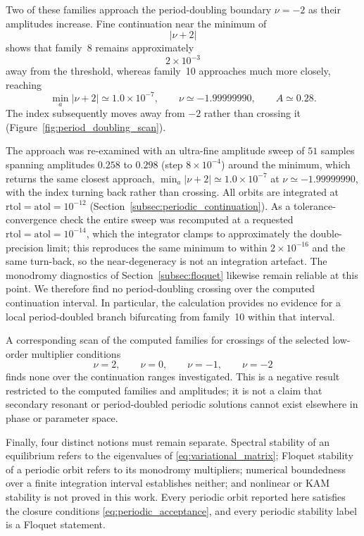 Two of these families approach the period-doubling boundary
$\nu=-2$ as their amplitudes increase. Fine continuation near the minimum
of
\[
|\nu+2|
\]
shows that family~8 remains approximately
\[
2\times10^{-3}
\]
away from the threshold, whereas family~10 approaches much more closely,
reaching
\begin{equation}
\min_a|\nu+2|
\simeq1.0\times10^{-7},
\qquad
\nu\simeq-1.99999990,
\qquad
A\simeq0.28.
\label{eq:near_period_doubling}
\end{equation}
The index subsequently moves away from $-2$ rather than crossing it
(Figure~\ref{fig:period_doubling_scan}).

The approach was re-examined with an ultra-fine amplitude sweep of $51$
samples spanning amplitudes $0.258$ to $0.298$ (step $8\times10^{-4}$) around
the minimum, which returns the same closest approach,
$\min_a|\nu+2|\simeq1.0\times10^{-7}$ at $\nu\simeq-1.99999990$, with the index
turning back rather than crossing. All orbits are integrated at
$\mathrm{rtol}=\mathrm{atol}=10^{-12}$
(Section~\ref{subsec:periodic_continuation}). As a tolerance-convergence check
the entire sweep was recomputed at a requested $\mathrm{rtol}=\mathrm{atol}=
10^{-14}$, which the integrator clamps to approximately the double-precision
limit; this reproduces the same minimum to within $2\times10^{-16}$ and the
same turn-back, so the near-degeneracy is not an integration artefact. The
monodromy diagnostics of Section~\ref{subsec:floquet} likewise remain reliable
at this point. We therefore find no
period-doubling crossing over the computed continuation interval. In
particular, the calculation provides no evidence for a local period-doubled
branch bifurcating from family~10 within that interval.

A corresponding scan of the computed families for crossings of the
selected low-order multiplier conditions
\[
\nu=2,\qquad
\nu=0,\qquad
\nu=-1,\qquad
\nu=-2
\]
finds none over the continuation ranges investigated. This is a negative
result restricted to the computed families and amplitudes; it is not a
claim that secondary resonant or period-doubled periodic solutions cannot
exist elsewhere in phase or parameter space.

Finally, four distinct notions must remain separate. Spectral stability of
an equilibrium refers to the eigenvalues of
\eqref{eq:variational_matrix}; Floquet stability of a periodic orbit refers
to its monodromy multipliers; numerical boundedness over a finite
integration interval establishes neither; and nonlinear or KAM stability
is not proved in this work. Every periodic orbit reported here satisfies
the closure conditions \eqref{eq:periodic_acceptance}, and every periodic
stability label is a Floquet statement.

